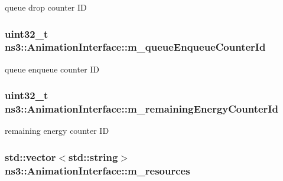 queue drop counter ID 

\subsubsection[{\texorpdfstring{m\+\_\+queue\+Enqueue\+Counter\+Id}{m_queueEnqueueCounterId}}]{\setlength{\rightskip}{0pt plus 5cm}uint32\+\_\+t ns3\+::\+Animation\+Interface\+::m\+\_\+queue\+Enqueue\+Counter\+Id\hspace{0.3cm}{\ttfamily [private]}}\hypertarget{classns3_1_1AnimationInterface_a794c549292d2c3e2d272e70d1c7ed237}{}\label{classns3_1_1AnimationInterface_a794c549292d2c3e2d272e70d1c7ed237}


queue enqueue counter ID 

\subsubsection[{\texorpdfstring{m\+\_\+remaining\+Energy\+Counter\+Id}{m_remainingEnergyCounterId}}]{\setlength{\rightskip}{0pt plus 5cm}uint32\+\_\+t ns3\+::\+Animation\+Interface\+::m\+\_\+remaining\+Energy\+Counter\+Id\hspace{0.3cm}{\ttfamily [private]}}\hypertarget{classns3_1_1AnimationInterface_ad5b3ee97e22015b057745c2f43000839}{}\label{classns3_1_1AnimationInterface_ad5b3ee97e22015b057745c2f43000839}


remaining energy counter ID 

\subsubsection[{\texorpdfstring{m\+\_\+resources}{m_resources}}]{\setlength{\rightskip}{0pt plus 5cm}std\+::vector$<$std\+::string$>$ ns3\+::\+Animation\+Interface\+::m\+\_\+resources\hspace{0.3cm}{\ttfamily [private]}}\hypertarget{classns3_1_1AnimationInterface_aeb82a7647d51e67201021b0030fb47ba}{}\label{classns3_1_1AnimationInterface_aeb82a7647d51e67201021b0030fb47ba}


